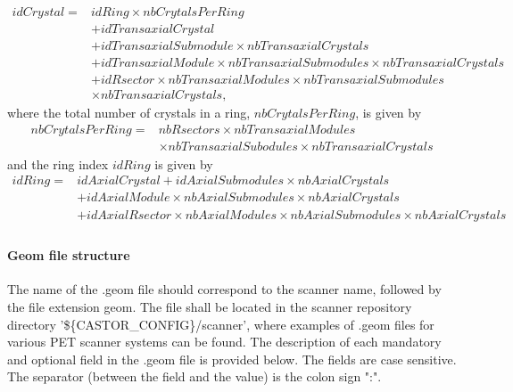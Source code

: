 \documentclass[a4paper, 11pt]{article}
\begin{document}
\begin{equation}
\begin{aligned}
idCrystal = & idRing \times nbCrytalsPerRing \\
                 & + idTransaxialCrystal \\
                 & + idTransaxialSubmodule \times nbTransaxialCrystals \\
                 & + idTransaxialModule \times nbTransaxialSubmodules \times nbTransaxialCrystals\\
                & + idRsector \times nbTransaxialModules \times nbTransaxialSubmodules\\
                &  \times nbTransaxialCrystals,
\end{aligned}
\label{eq_crystalID}
\end{equation}
where the total number of crystals in a ring, $nbCrytalsPerRing$, is  given by
\begin{equation}
\begin{aligned}
nbCrytalsPerRing = & nbRsectors \times nbTransaxialModules \\
                            & \times nbTransaxialSubodules \times nbTransaxialCrystals
\end{aligned}
\label{eq_nCrytalsPerRing}
\end{equation}
and the ring index $idRing$ is given by
\begin{equation}
\begin{aligned}
idRing = & idAxialCrystal + idAxialSubmodules \times  nbAxialCrystals \\
              &+ idAxialModule \times nbAxialSubmodules \times nbAxialCrystals \\
              &+ idAxialRsector \times nbAxialModules \times nbAxialSubmodules \times nbAxialCrystals \\
\end{aligned}
\label{eq_idRing}
\end{equation}

\paragraph{Geom file structure}
The name of the .geom file should correspond to the scanner name, followed by the file extension geom.
The file shall be located in the scanner repository directory '\$\{CASTOR\_CONFIG\}/scanner',
where examples of .geom files for various PET scanner systems can be found.
The description of each mandatory and optional field in the .geom file is provided below. 
The fields are case sensitive. The separator (between the field and the value) is the colon sign ":".
\end{document}
